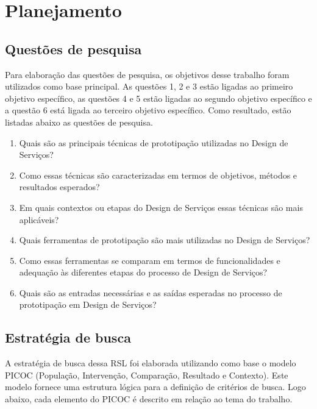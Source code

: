 \section{Planejamento}

\subsection{Questões de pesquisa}

Para elaboração das questões de pesquisa, os objetivos desse trabalho foram utilizados como base principal. As questões 1, 2 e 3 estão ligadas ao primeiro objetivo específico, as questões 4 e 5 estão ligadas ao segundo objetivo específico e a questão 6 está ligada ao terceiro objetivo específico. Como resultado, estão listadas abaixo as questões de pesquisa.


\begin{enumerate}
	
	\item Quais são as principais técnicas de prototipação utilizadas no Design de Serviços?
	\item Como essas técnicas são caracterizadas em termos de objetivos, métodos e resultados esperados?
	\item Em quais contextos ou etapas do Design de Serviços essas técnicas são mais aplicáveis?
	
	\item Quais ferramentas de prototipação são mais utilizadas no Design de Serviços?
	\item Como essas ferramentas se comparam em termos de funcionalidades e adequação às diferentes etapas do processo de Design de Serviços?
	
	\item Quais são as entradas necessárias e as saídas esperadas no processo de prototipação em Design de Serviços?
	
\end{enumerate}


\subsection{Estratégia de busca}

A estratégia de busca dessa RSL foi elaborada utilizando como base o modelo PICOC (População, Intervenção, Comparação, Resultado e Contexto). Este modelo fornece uma estrutura lógica para a definição de critérios de busca. Logo abaixo, cada elemento do PICOC é descrito em relação ao tema do trabalho.

